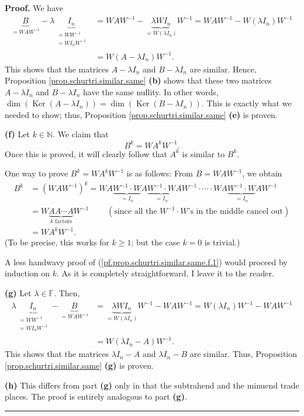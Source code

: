 \documentclass[numbers=enddot,12pt,final,onecolumn,notitlepage]{scrartcl}%
\numberwithin{exer}{subsection}
\theoremstyle{definition}
\newenvironment{proof}[1][Proof]{\noindent\textbf{#1.} }{\ \rule{0.5em}{0.5em}}
\begin{document}
\begin{proof}
We have%
\begin{align*}
\underbrace{B}_{=WAW^{-1}}-\lambda\underbrace{I_{n}}_{\substack{=WW^{-1}%
\\=WI_{n}W^{-1}}}  &  =WAW^{-1}-\underbrace{\lambda WI_{n}}_{=W\left(  \lambda
I_{n}\right)  }W^{-1}=WAW^{-1}-W\left(  \lambda I_{n}\right)  W^{-1}\\
&  =W\left(  A-\lambda I_{n}\right)  W^{-1}.
\end{align*}
This shows that the matrices $A-\lambda I_{n}$ and $B-\lambda I_{n}$ are
similar. Hence, Proposition \ref{prop.schurtri.similar.same} \textbf{(b)}
shows that these two matrices $A-\lambda I_{n}$ and $B-\lambda I_{n}$ have the
same nullity. In other words, $\dim\left(  \operatorname*{Ker}\left(
A-\lambda I_{n}\right)  \right)  =\dim\left(  \operatorname*{Ker}\left(
B-\lambda I_{n}\right)  \right)  $. This is exactly what we needed to show;
thus, Proposition \ref{prop.schurtri.similar.same} \textbf{(e)} is proven.
\medskip

\textbf{(f)} Let $k\in\mathbb{N}$. We claim that
\begin{equation}
B^{k}=WA^{k}W^{-1}. \label{pf.prop.schurtri.similar.same.f.1}%
\end{equation}
Once this is proved, it will clearly follow that $A^{k}$ is similar to $B^{k}$.

One way to prove $B^{k}=WA^{k}W^{-1}$ is as follows: From $B=WAW^{-1}$, we
obtain%
\begin{align*}
B^{k}  &  =\left(  WAW^{-1}\right)  ^{k}=WA\underbrace{W^{-1}\cdot W}_{=I_{n}%
}A\underbrace{W^{-1}\cdot W}_{=I_{n}}AW^{-1}\cdot\cdots\cdot
WA\underbrace{W^{-1}\cdot W}_{=I_{n}}AW^{-1}\\
&  =W\underbrace{AA\cdots A}_{k\text{ factors}}W^{-1}%
\ \ \ \ \ \ \ \ \ \ \left(  \text{since all the }W^{-1}\cdot W\text{'s in the
middle cancel out}\right) \\
&  =WA^{k}W^{-1}.
\end{align*}
(To be precise, this works for $k\geq1$; but the case $k=0$ is trivial.)

A less handwavy proof of (\ref{pf.prop.schurtri.similar.same.f.1}) would
proceed by induction on $k$. As it is completely straightforward, I leave it
to the reader. \medskip

\textbf{(g)} Let $\lambda\in\mathbb{F}$. Then,
\begin{align*}
\lambda\underbrace{I_{n}}_{\substack{=WW^{-1}\\=WI_{n}W^{-1}}}-\underbrace{B}%
_{=WAW^{-1}}  &  =\underbrace{\lambda WI_{n}}_{=W\left(  \lambda I_{n}\right)
}W^{-1}-WAW^{-1}=W\left(  \lambda I_{n}\right)  W^{-1}-WAW^{-1}\\
&  =W\left(  \lambda I_{n}-A\right)  W^{-1}.
\end{align*}
This shows that the matrices $\lambda I_{n}-A$ and $\lambda I_{n}-B$ are
similar. Thus, Proposition \ref{prop.schurtri.similar.same} \textbf{(g)} is
proven.\medskip

\textbf{(h)} This differs from part \textbf{(g)} only in that the subtrahend
and the minuend trade places. The proof is entirely analogous to part
\textbf{(g)}.
\end{proof}
\end{document}
